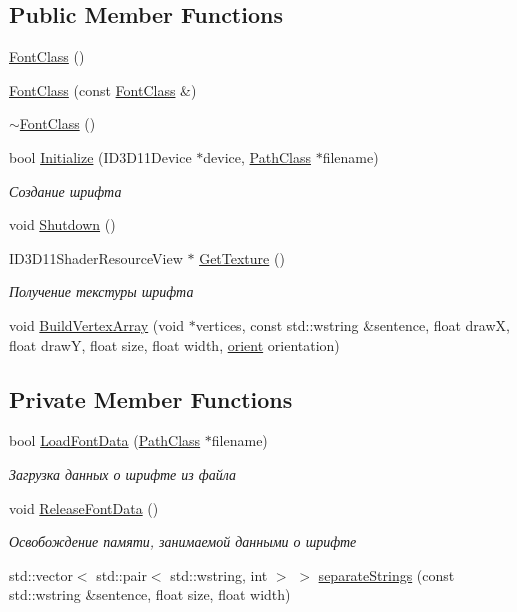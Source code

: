 \subsection*{Public Member Functions}
\begin{DoxyCompactItemize}
\item 
\hyperlink{class_font_class_af5d12adf70f868e6aaa7fbcbeafdff24}{Font\+Class} ()
\item 
\hyperlink{class_font_class_a5c384c68e547994bd92c47f5427b341b}{Font\+Class} (const \hyperlink{class_font_class}{Font\+Class} \&)
\item 
\hyperlink{class_font_class_a594bef7039855b7db30d92699b6ec975}{$\sim$\+Font\+Class} ()
\item 
bool \hyperlink{class_font_class_a8fc92462eeb4c844d08447d12a88656a}{Initialize} (I\+D3\+D11\+Device $\ast$device, \hyperlink{class_path_class}{Path\+Class} $\ast$filename)
\begin{DoxyCompactList}\small\item\em Создание шрифта \end{DoxyCompactList}\item 
void \hyperlink{class_font_class_a4140e56fb5accb5e11b2471e9bb8a640}{Shutdown} ()
\item 
I\+D3\+D11\+Shader\+Resource\+View $\ast$ \hyperlink{class_font_class_a08b7984b21e1d7b6a5dbc45ab96dbf50}{Get\+Texture} ()
\begin{DoxyCompactList}\small\item\em Получение текстуры шрифта \end{DoxyCompactList}\item 
void \hyperlink{class_font_class_a8012fb1b59ee4c3e2b3e59b97daf8c5a}{Build\+Vertex\+Array} (void $\ast$vertices, const std\+::wstring \&sentence, float drawX, float drawY, float size, float width, \hyperlink{class_font_class_a66bce9a04891356d0db3e0115ea6971a}{orient} orientation)
\end{DoxyCompactItemize}
\subsection*{Private Member Functions}
\begin{DoxyCompactItemize}
\item 
bool \hyperlink{class_font_class_adc6573e97e013faf2940d58384620a2b}{Load\+Font\+Data} (\hyperlink{class_path_class}{Path\+Class} $\ast$filename)
\begin{DoxyCompactList}\small\item\em Загрузка данных о шрифте из файла \end{DoxyCompactList}\item 
void \hyperlink{class_font_class_aec373d668d9d68dd3543971f8b89a116}{Release\+Font\+Data} ()
\begin{DoxyCompactList}\small\item\em Освобождение памяти, занимаемой данными о шрифте \end{DoxyCompactList}\item 
std\+::vector$<$ std\+::pair$<$ std\+::wstring, int $>$ $>$ \hyperlink{class_font_class_a42f7a7f9e9a10016d2293bf3b0730f9e}{separate\+Strings} (const std\+::wstring \&sentence, float size, float width)
\end{DoxyCompactItemize}
